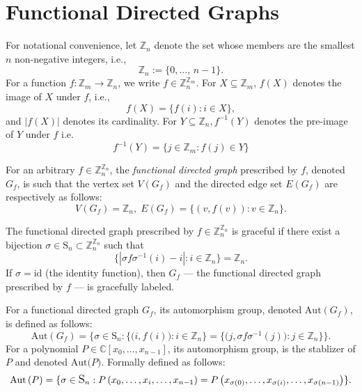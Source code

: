 \section{Functional Directed Graphs}\label{sec:Functional Directed Graphs}
For notational convenience, let $\mathbb{Z}_{n}$ denote the set whose members are the smallest $n$ non-negative integers, i.e.,
\begin{equation}
\mathbb{Z}_{n}:=\big\{0,\ldots,\,n-1\big\}.
\end{equation}
For a function $f:\mathbb{Z}_{m}\to\mathbb{Z}_{n}$, we write $f\in\mathbb{Z}_{n}^{\mathbb{Z}_{m}}$.
For $X\subseteq\mathbb{Z}_{m}$, $f(X)$ denotes the image of $X$
under $f$, i.e.,
\begin{equation}
f(X)=\{f(i):i\in X\},
\end{equation}
and $|f(X)|$ denotes its
cardinality. For $Y\subseteq\mathbb{Z}_{n}\ensuremath{,}f^{-1}(Y)$
denotes the pre-image of $Y$ under $f$ i.e.
\begin{equation}
f^{-1}(Y)=\{j\in\mathbb{Z}_{m}:f(j)\in Y\}
\end{equation}
\begin{definition}\label{defn:functional-directed-graphs}
For an arbitrary $f\in \mathbb{Z}_n^{\mathbb{Z}_n}$, the \emph{functional directed graph} prescribed by $f$, denoted $G_f$, is such that the vertex set $V(G_f)$ and the directed edge set $E(G_f)$ are respectively as follows:
\[
V(G_f) = \mathbb{Z}_n, \; E(G_f) = \{(v,f(v)):v \in \mathbb{Z}_n\}.
\]
\end{definition}
\begin{definition}\label{defn:graceful-functional-graphs}
The functional directed graph prescribed by $f\in\mathbb{Z}_{n}^{\mathbb{Z}_{n}}$ is graceful if there exist
a bijection $\sigma\in \text{S}_n \subset
 \mathbb{Z}_{n}^{\mathbb{Z}_{n}}$ such that
\begin{equation}
\big\{\left|\sigma f\sigma^{-1}(i)-i\right|:i\in\mathbb{Z}_{n}\big\}=\mathbb{Z}_{n}.
\end{equation}
If $\sigma=\text{id}$ (the identity function), then $G_{f}$ --- the functional directed graph prescribed by $f$ --- is gracefully labeled. 
\end{definition}
\begin{defn}\label{defn:aut-functional-graphs}
For a functional directed graph $G_f$, its automorphism group, denoted $\text{Aut}\left(G_f\right)$, is defined as follows:
\[
\text{Aut}(G_{f})=\big\{\sigma\in\text{S}_{n}:\{\big(i,f(i)\big):i\in\mathbb{Z}_{n}\}=\{\big(j,\sigma f\sigma^{-1}(j)\big):j\in\mathbb{Z}_{n}\}\big\}.
\]
For a polynomial $P \in \mathbb{C}[x_0, \ldots, x_{n-1}]$, its automorphism group, is the stablizer of $P$ and denoted $\text{Aut($P$)}$. Formally defined as follows:
\[
\text{Aut}\left(P\right)=\large\{\sigma\in\text{S}_{n}:P\left(x_{0},\ldots,x_{i},\ldots,x_{n-1}\right)=P\left(x_{\sigma(0)},\ldots,x_{\sigma(i)},\ldots,x_{\sigma(n-1)}\right)\large\}.
\]
\end{defn}
